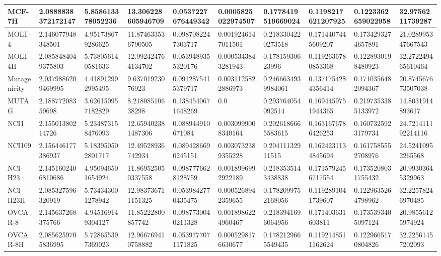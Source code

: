 \documentclass{article}
\begin{document}
\begin{table}[!ht]
\begin{tabular}{|l|l|l|l|l|l|l|l|l|l|}
        MCF-7H & 2.0888838372172147 & 5.858613378052236 & 13.306228605946709 & 0.0537227676449342 & 0.0005825022974507 & 0.1778419519669024 & 0.1198217621207925 & 0.1223362659022958 & 32.9756211739287 \\ \hline
        MOLT-4 & 2.146077948348501 & 4.951738679286625 & 11.874633536790505 & 0.0987082247303717 & 0.0019246147011501 & 0.2183304220273518 & 0.1714407445609207 & 0.1734293274657891 & 21.028995347667543 \\ \hline
        MOLT-4H & 2.0858484049375803 & 5.738056140581633 & 12.992424764134702 & 0.0539489355320176 & 0.0005343843281943 & 0.17815930623996 & 0.1192636780853368 & 0.1228930198480923 & 32.272249465610464 \\ \hline
        Mutagenicity & 2.0379886209469995 & 4.418912992995495 & 9.63701923076923 & 0.0912875415379717 & 0.0031125822886973 & 0.2466634939984061 & 0.1371754284356414 & 0.1710356482094367 & 20.874567673507038 \\ \hline
        MUTAG & 2.18877208359698 & 3.626150957182829 & 8.21808510638298 & 0.1384540671648269 & 0.0 & 0.293764054092514 & 0.1694459751944365 & 0.2197353385133972 & 14.8031914893617 \\ \hline
        NCI1 & 2.15501380214726 & 5.234873158476093 & 12.659402381487306 & 0.088944910671084 & 0.0030999008340164 & 0.2026186665583615 & 0.1631676786426253 & 0.1607325923179734 & 24.721411192214116 \\ \hline
        NCI109 & 2.156446177386937 & 5.183950502801717 & 12.49528936742934 & 0.0894286690245151 & 0.0030732389355228 & 0.20411132911515 & 0.1624231134845694 & 0.1617585552708976 & 24.52410952265568 \\ \hline
        NCI-H23 & 2.1451602406810686 & 4.950946501654924 & 11.869525050337558 & 0.0987776628128759 & 0.0018996992922189 & 0.2183535143438838 & 0.1715792456717554 & 0.1735208031755432 & 20.99303645329963 \\ \hline
        NCI-H23H & 2.085327596320919 & 5.734343001278942 & 12.983736711151325 & 0.0539842770435475 & 0.0005268942359655 & 0.1782099752168056 & 0.1192891041739607 & 0.1229635264798962 & 32.22578246970485 \\ \hline
        OVCAR-8 & 2.145637268375766 & 4.945169149304127 & 11.85222800857742 & 0.0987730040211328 & 0.0018986224960467 & 0.2183941696064956 & 0.171403631603811 & 0.1735393405097124 & 20.98556125974924 \\ \hline
        OVCAR-8H & 2.0856259705836995 & 5.728655397369023 & 12.966769410758882 & 0.0539777071171825 & 0.0005298176630677 & 0.1782129665549435 & 0.1192148511162624 & 0.1229665170804826 & 32.22561457202093 \\ \hline

\end{tabular}
\end{table}
\end{document}
